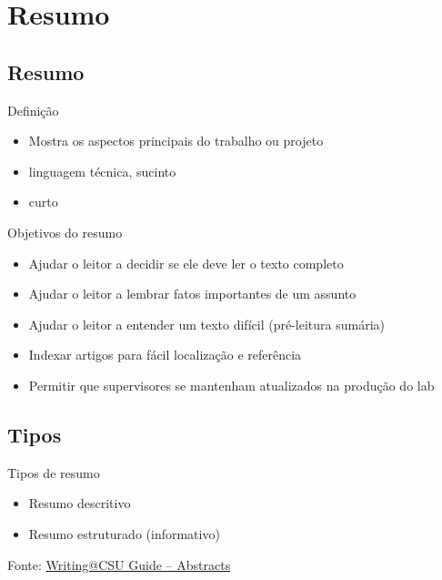 \documentclass{beamer}
\begin{document}
\section{Resumo}

\subsection{Resumo}

\begin{frame}{Definição}
  \begin{itemize}
    \footnotesize
  \item Mostra os aspectos principais do trabalho ou projeto
    \bigskip
  \item linguagem técnica, sucinto
    \bigskip
  \item curto
  \end{itemize}
\end{frame}

\begin{frame}{Objetivos do resumo}
  \begin{itemize}
    \footnotesize
  \item Ajudar o leitor a decidir se ele deve ler o texto completo
    \bigskip


  \item Ajudar o leitor a lembrar fatos importantes de um assunto
    \bigskip


  \item Ajudar o leitor a entender um texto difícil (pré-leitura
    sumária)
    \bigskip

  \item Indexar artigos para fácil localização e referência
    \bigskip

  \item Permitir que supervisores se mantenham atualizados na produção
    do lab
  \end{itemize}
\end{frame}

\subsection{Tipos}

\begin{frame}{Tipos de resumo}
  \begin{itemize}
    \footnotesize
  \item Resumo descritivo
    \bigskip
    \bigskip
  \item Resumo estruturado (informativo)
  \end{itemize}

  \vfill
  \scriptsize
  \hfill Fonte: \href{https://writing.colostate.edu/guides/guide.cfm?guideid=59}{Writing@CSU Guide -- Abstracts}
\end{frame}
\end{document}
